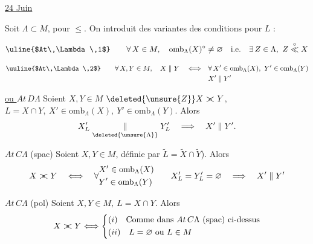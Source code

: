 \uline{24 Juin}

Soit $\Lambda\subset M$,  pour $\leq$. On introduit des variantes des conditions  pour $L$ :

\[
\text{\uline{$At\,\Lambda\,1$}}\qquad \forall\,X\in M,\quad \mathrm{omb}_{\Lambda}(X)^\circ\ne\varnothing\quad\text{i.e.}\quad \exists\,Z\in\Lambda,\ Z\overset{\circ}{\ll} X
\]

\[
\begin{aligned}
\text{\uuline{$At\,\Lambda\,2$}}\qquad \forall\,X,Y\in M,\quad X\parallel Y\quad\Longleftrightarrow\quad &\forall\,X'\in \mathrm{omb}_{\Lambda}(X),\ Y'\in \mathrm{omb}_{\Lambda}(Y)\\
&X'\parallel Y'
\end{aligned}
\]

 \uline{ou $At\,D\Lambda$} Soient $X,Y\in M$   $\deleted{\unsure{Z}}X\mathrel{\rlap{$>$}<} Y$,  $L=X\cap Y,\ X'\in \mathrm{omb}_{\Lambda}(X),\ Y'\in \mathrm{omb}_{\Lambda}(Y)$. Alors
\[
X'_L\mathrel{\underset{\deleted{\unsure{\Lambda}}}{\parallel}}Y'_L\quad\Longrightarrow\quad X'\parallel Y'.
\]

\uline{$At\,C\Lambda$} (spac) Soient $X,Y\in M$,   définie par $\widetilde L=\widetilde X\cap\widetilde Y$). Alors
\[
X\mathrel{\rlap{$>$}<} Y\quad\Longleftrightarrow\quad
\forall\begin{aligned}&X'\in \mathrm{omb}_{\Lambda}(X)\\&Y'\in \mathrm{omb}_{\Lambda}(Y)\end{aligned}
\qquad X'_L=Y'_L=\varnothing\quad\Longrightarrow\quad X'\parallel Y'
\]

\uline{$At\,C\Lambda$} (pol) Soient $X,Y\in M,\ L=X\cap Y$. Alors
\[
X\mathrel{\rlap{$>$}<} Y\Longleftrightarrow\left\{\begin{aligned}
&(i)\quad\text{Comme dans }At\,C\Lambda\ \text{(spac) ci-dessus}\\
&(ii)\quad L=\varnothing\ \text{ou } L\in M
\end{aligned}\right.
\]

